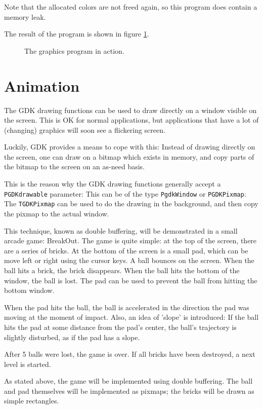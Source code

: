 \documentclass[10pt]{article}
\newcommand{\var}[1]{\texttt{#1}}
\begin{document}
Note that the allocated colors are not freed again, so this program does
contain a memory leak.

The result of the program is shown in figure \ref{fig:screenshot1}.
\begin{figure}[ht]
\caption{The graphics program in action.}\label{fig:screenshot1}
\end{figure}

\section{Animation}
The GDK drawing functions can be used to draw directly on a window visible
on the screen. This is OK for normal applications, but applications that
have a lot of (changing) graphics will soon see a flickering screen. 

Luckily, GDK provides a means to cope with this: Instead of drawing directly
on the screen, one can draw on a bitmap which exists in memory, and copy
parts of the bitmap to the screen on an as-need basis.

This is the reason why the GDK drawing functions generally accept a
\var{PGDKdrawable} parameter: This can be of the type \var{PgdkWindow} or
\var{PGDKPixmap}: The \var{TGDKPixmap} can be used to do the drawing in the
background, and then copy the pixmap to the actual window. 

This technique, known as double buffering, will be demonstrated in a small
arcade game: BreakOut. The game is quite simple: at the top of the screen,
there are a series of bricks. At the bottom of the screen is a small pad,
which can be move left or right using the cursor keys. A ball bounces on the
screen. When the ball hits a brick, the brick disappears. When the ball
hits the bottom of the window, the ball is lost. The pad can be used to
prevent the ball from hitting the bottom window.

When the pad hits the ball, the ball is accelerated in the direction the
pad was moving at the moment of impact. Also, an idea of 'slope' is
introduced: If the ball hits the pad at some distance from the pad's center,
the ball's trajectory is slightly disturbed, as if the pad has a slope.

After 5 balls were lost, the game is over. If all bricks have been
destroyed, a next level is started.

As stated above, the game will be implemented using double buffering.
The ball and pad themselves will be implemented as pixmaps; the bricks
will be drawn as simple rectangles.
\end{document}
